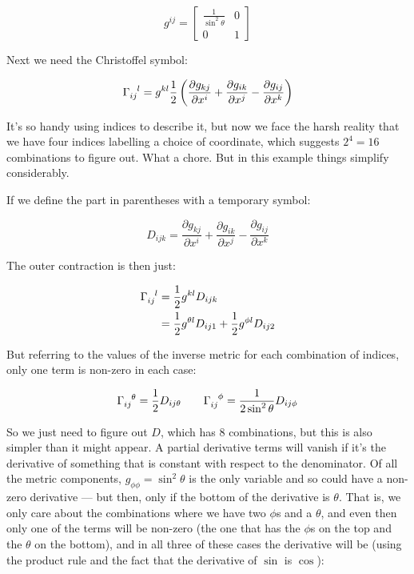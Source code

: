 $$
g^{ij} = \begin{bmatrix}\frac{1}{\sin^2 \theta} & 0 \\ 0 & 1\end{bmatrix} 
$$

Next we need the Christoffel symbol:

$$
\Gamma\indices{_i_j^l}
=
g^{kl}
\frac{1}{2}
\left(
\frac{\partial g_{kj}}{\partial x^i} 
+
\frac{\partial g_{ik}}{\partial x^j} 
-
\frac{\partial g_{ij}}{\partial x^k} 
\right)
$$

It's so handy using indices to describe it, but now we face the harsh reality that we have four indices labelling a choice of coordinate, which suggests $2^4=16$ combinations to figure out. What a chore. But in this example things simplify considerably.

If we define the part in parentheses with a temporary symbol:

$$
D_{ijk} 
= 
\frac{\partial g_{kj}}{\partial x^i} 
+
\frac{\partial g_{ik}}{\partial x^j} 
-
\frac{\partial g_{ij}}{\partial x^k} 
$$

The outer contraction is then just:

\begin{equation}    
\begin{split}
\Gamma\indices{_i_j^l}
&= \frac{1}{2} g^{kl} D_{ijk} \\
&= \frac{1}{2} g^{\theta l} D_{ij1} + \frac{1}{2} g^{\phi l} D_{ij2}
\end{split}
\end{equation}

But referring to the values of the inverse metric for each combination of indices, only one term is non-zero in each case:

$$
\Gamma\indices{_i_j^\theta} = \frac{1}{2} D_{ij\theta}
\quad \quad
\Gamma\indices{_i_j^\phi} = \frac{1}{2\sin^2 \theta} D_{ij\phi}
$$

So we just need to figure out $D$, which has 8 combinations, but this is also simpler than it might appear. A partial derivative terms will vanish if it's the derivative of something that is constant with respect to the denominator. Of all the metric components, $g_{\phi\phi} = \sin^2 \theta$ is the only variable and so could have a non-zero derivative --- but then, only if the bottom of the derivative is $\theta$. That is, we only care about the combinations where we have two $\phi$s and a $\theta$, and even then only one of the terms will be non-zero (the one that has the $\phi$s on the top and the $\theta$ on the bottom), and in all three of these cases the derivative will be (using the product rule and the fact that the derivative of $\sin$ is $\cos$):

